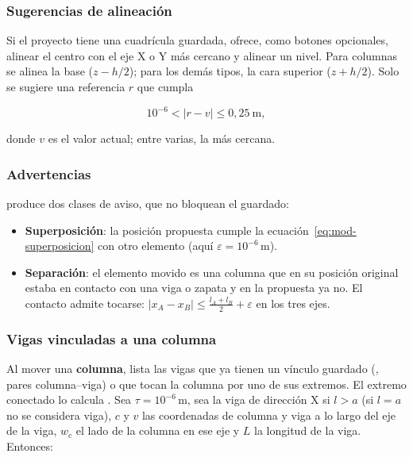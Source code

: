 \subsubsection{Sugerencias de alineación}

Si el proyecto tiene una cuadrícula guardada,  ofrece, como botones opcionales,
alinear el centro con el eje X o Y más cercano y alinear un nivel. Para columnas se alinea la base
($z - h/2$); para los demás tipos, la cara superior ($z + h/2$). Solo se sugiere una referencia $r$ que cumpla

\begin{equation}
	10^{-6} < \lvert r - v \rvert \le 0{,}25\ \text{m},
\end{equation}

\noindent donde $v$ es el valor actual; entre varias, la más cercana.

\subsubsection{Advertencias}

 produce dos clases de aviso, que no bloquean el guardado:

\begin{itemize}
	\item \textbf{Superposición}: la posición propuesta cumple la ecuación~\eqref{eq:mod-superposicion} con otro
	      elemento (aquí $\varepsilon = 10^{-6}$\,m).
	\item \textbf{Separación}: el elemento movido es una columna que en su posición original estaba en contacto con una
	      viga o zapata y en la propuesta ya no. El contacto admite tocarse:
	      $\lvert x_A - x_B \rvert \le \tfrac{l_A + l_B}{2} + \varepsilon$ en los tres ejes.
\end{itemize}

\subsubsection{Vigas vinculadas a una columna}

Al mover una \textbf{columna},  lista las vigas que ya tienen un vínculo guardado
(, pares columna--viga) o que tocan la columna por uno de sus extremos. El extremo conectado
lo calcula . Sea $\tau = 10^{-6}$\,m, sea la viga de dirección X si
$l > a$ (si $l = a$ no se considera viga), $c$ y $v$ las coordenadas de columna y viga a lo largo del eje de la viga,
$w_c$ el lado de la columna en ese eje y $L$ la longitud de la viga. Entonces:

